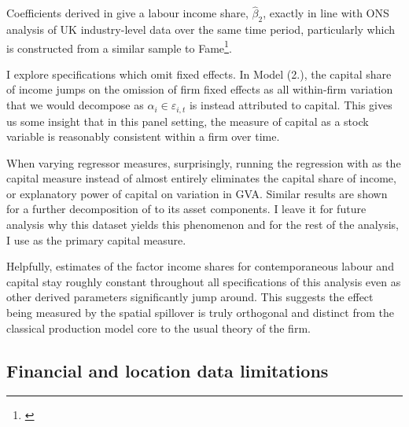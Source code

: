 Coefficients derived in  give a labour income share, $\hat\beta_2$,
exactly in line with ONS analysis of UK industry-level data
over the same time period, particularly  which is constructed
from a similar sample to Fame\footnote{\cite{ons2024:labour-share-uk}}.
\par
I explore specifications which omit fixed effects.
In Model (2.), the capital share of income jumps on the omission of firm fixed effects
as all within-firm variation that we would decompose as $\alpha_i\in \varepsilon_{i,t}$
is instead attributed to capital.
This gives us some insight that in this panel setting,
the measure of capital as a stock variable is reasonably consistent within a firm over time.
\par
When varying regressor measures, surprisingly,
running the regression with  as the capital measure instead of 
almost entirely eliminates the capital share of income, or explanatory power of capital on variation in GVA.
Similar results are shown for a further decomposition of  to its asset components.
I leave it for future analysis why this dataset yields this phenomenon and
for the rest of the analysis, I use  as the primary capital measure.
\par
Helpfully, estimates of the factor income shares for contemporaneous labour and capital
stay roughly constant throughout all specifications of this analysis
even as other derived parameters significantly jump around.
This suggests the effect being measured by the spatial spillover
is truly orthogonal and distinct from the classical production model
core to the usual theory of the firm.


\subsection{Financial and location data limitations}
\label{ss:data-limitations}

